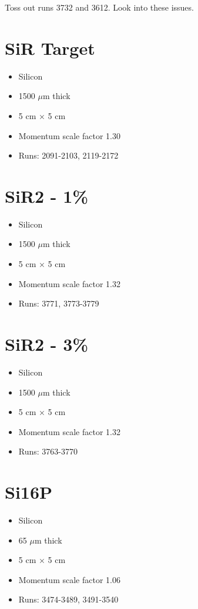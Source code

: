 \documentclass[a4paper]{article}
\begin{document}
Toss out runs 3732 and 3612. Look into these issues.



\section{SiR Target}
\begin{itemize}
  \item Silicon
  \item 1500 $\mu$m thick
  \item 5 cm $\times$ 5 cm
  \item Momentum scale factor 1.30
  \item Runs:
    2091-2103, 2119-2172
\end{itemize}


\section{SiR2 - 1\%}
\begin{itemize}
  \item Silicon
  \item 1500 $\mu$m thick
  \item 5 cm $\times$ 5 cm
  \item Momentum scale factor 1.32
  \item Runs:
    3771, 3773-3779
\end{itemize}
\section{SiR2 - 3\%}
\begin{itemize}
  \item Silicon
  \item 1500 $\mu$m thick
  \item 5 cm $\times$ 5 cm
  \item Momentum scale factor 1.32
  \item Runs:
    3763-3770
\end{itemize}
\section{Si16P}
\begin{itemize}
  \item Silicon
  \item 65 $\mu$m thick
  \item 5 cm $\times$ 5 cm
  \item Momentum scale factor 1.06
  \item Runs:
    3474-3489, 3491-3540
\end{itemize}
\end{document}
